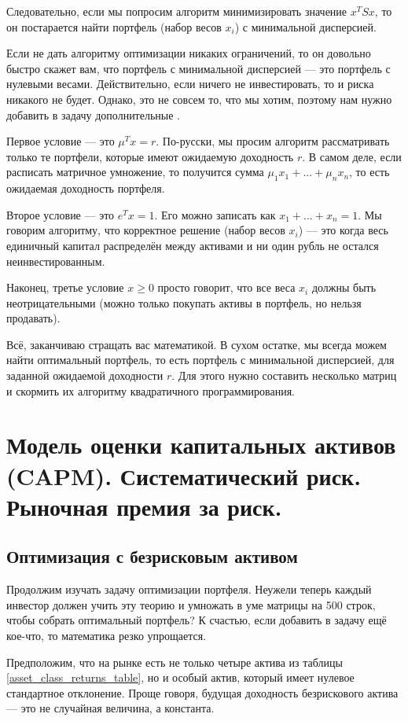 Следовательно, если мы попросим алгоритм минимизировать значение $x^TSx$, то он постарается найти портфель (набор весов $x_i$) с минимальной дисперсией.

Если не дать алгоритму оптимизации никаких ограничений, то он довольно быстро скажет вам, что портфель с минимальной дисперсией --- это портфель с нулевыми весами. Действительно, если ничего не инвестировать, то и риска никакого не будет. Однако, это не совсем то, что мы хотим, поэтому нам нужно добавить в задачу дополнительные .

Первое условие --- это $\mu^Tx = r$. По-русски, мы просим алгоритм рассматривать только те портфели, которые имеют ожидаемую доходность $r$. В самом деле, если расписать матричное умножение, то получится сумма $\mu_1x_1 + ... + \mu_nx_n$, то есть ожидаемая доходность портфеля.

Второе условие --- это $e^Tx = 1$. Его можно записать как $x_1 + ... + x_n = 1$. Мы говорим алгоритму, что корректное решение (набор весов $x_i$) --- это когда весь единичный капитал распределён между активами и ни один рубль не остался неинвестированным.

Наконец, третье условие $x \ge 0$ просто говорит, что все веса $x_i$ должны быть неотрицательными (можно только покупать активы в портфель, но нельзя продавать).

Всё, заканчиваю стращать вас математикой. В сухом остатке, мы всегда можем найти оптимальный портфель, то есть портфель с минимальной дисперсией, для заданной ожидаемой доходности $r$. Для этого нужно составить несколько матриц и скормить их алгоритму квадратичного программирования.

\section{Модель оценки капитальных активов (CAPM). Систематический риск. Рыночная премия за риск.}

\subsection{Оптимизация с безрисковым активом}

Продолжим изучать задачу оптимизации портфеля. Неужели теперь каждый инвестор должен учить эту теорию и умножать в уме матрицы на 500 строк, чтобы собрать оптимальный портфель? К счастью, если добавить в задачу ещё кое-что, то математика резко упрощается.

Предположим, что на рынке есть не только четыре актива из таблицы \ref{asset_class_returns_table}, но и особый  актив, который имеет нулевое стандартное отклонение. Проще говоря, будущая доходность безрискового актива --- это не случайная величина, а константа. 

